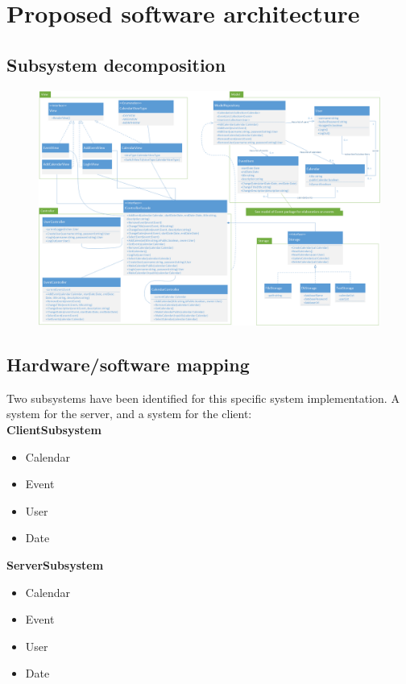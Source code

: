 \documentclass[10pt]{report}
\numberwithin{equation}{section} %
\numberwithin{figure}{section} %
\numberwithin{table}{section} %
\begin{document}
\section{Proposed software architecture}

\subsection{Subsystem decomposition}
\begin{figure}[H]
  \includegraphics[scale=0.40]{figures/classdiagram.png}
\end{figure}

\subsection{Hardware/software mapping}
Two subsystems have been identified for this specific system implementation. A
system for the server, and a system for the client:\\
\textbf{ClientSubsystem}
\begin{itemize}
\item Calendar
\item Event
\item User
\item Date
\end{itemize}

\textbf{ServerSubsystem}
\begin{itemize}
\item Calendar
\item Event
\item User
\item Date
\end{itemize}
\end{document}

